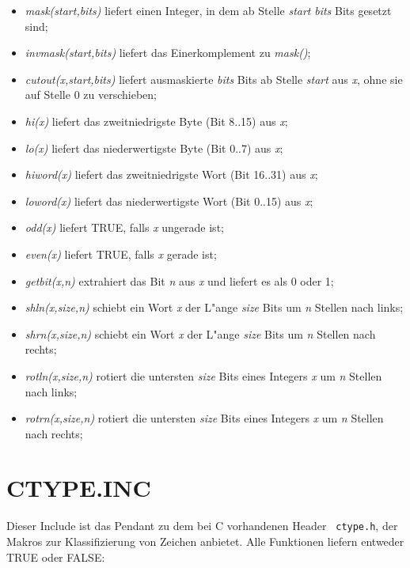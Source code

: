 \documentclass[12pt,a4paper,twoside]{report}
\begin{document}
\begin{itemize}
\item{{\em mask(start,bits)} liefert einen Integer, in dem ab Stelle {\em
      start} {\em bits} Bits gesetzt sind;}
\item{{\em invmask(start,bits)} liefert das Einerkomplement zu {\em mask()};}
\item{{\em cutout(x,start,bits)} liefert ausmaskierte {\em bits} Bits ab
      Stelle {\em start} aus {\em x}, ohne sie auf Stelle 0 zu
      verschieben;}
\item{{\em hi(x)} liefert das zweitniedrigste Byte (Bit 8..15) aus {\em
      x};}
\item{{\em lo(x)} liefert das niederwertigste Byte (Bit 0..7) aus {\em
      x};}
\item{{\em hiword(x)} liefert das zweitniedrigste Wort (Bit 16..31) aus
      {\em x};}
\item{{\em loword(x)} liefert das niederwertigste Wort (Bit 0..15) aus
      {\em x};}
\item{{\em odd(x)} liefert TRUE, falls {\em x} ungerade ist;}
\item{{\em even(x)} liefert TRUE, falls {\em x} gerade ist;}
\item{{\em getbit(x,n)} extrahiert das Bit {\em n} aus {\em x} und liefert
      es als 0 oder 1;}
\item{{\em shln(x,size,n)} schiebt ein Wort {\em x} der L"ange {\em size}
      Bits um {\em n} Stellen nach links;}
\item{{\em shrn(x,size,n)} schiebt ein Wort {\em x} der L"ange {\em size}
      Bits um {\em n} Stellen nach rechts;}
\item{{\em rotln(x,size,n)} rotiert die untersten {\em size} Bits eines
      Integers {\em x} um {\em n} Stellen nach links;}
\item{{\em rotrn(x,size,n)} rotiert die untersten {\em size} Bits eines
      Integers {\em x} um {\em n} Stellen nach rechts;}
\end{itemize}

\section{CTYPE.INC}

Dieser Include ist das Pendant zu dem bei C vorhandenen Header {\tt
ctype.h}, der Makros zur Klassifizierung von Zeichen anbietet.  Alle
Funktionen liefern entweder TRUE oder FALSE:
\end{document}
